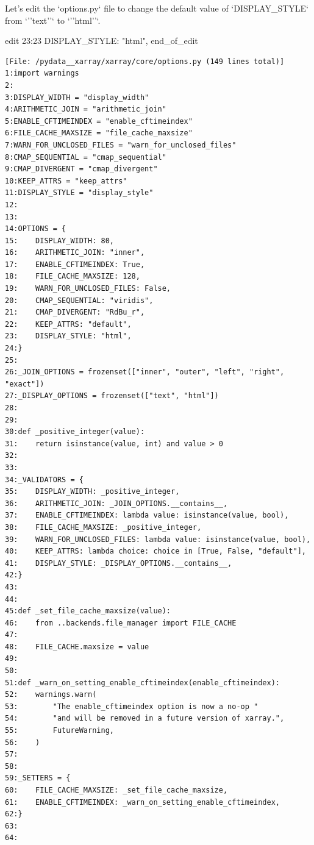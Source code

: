 {\begin{agentbox}
Let's edit the `options.py` file to change the default value of `DISPLAY\_STYLE` from `''text''` to `''html''`.



\hrulefill
\begin{CodeVerbatim}[breaklines=true, breakanywhere=true]
edit 23:23
    DISPLAY_STYLE: "html",
end_of_edit
\end{CodeVerbatim}
\end{agentbox}
\begin{observationbox}\begin{Verbatim}[breaklines=true, breakanywhere=true]
[File: /pydata__xarray/xarray/core/options.py (149 lines total)]
1:import warnings
2:
3:DISPLAY_WIDTH = "display_width"
4:ARITHMETIC_JOIN = "arithmetic_join"
5:ENABLE_CFTIMEINDEX = "enable_cftimeindex"
6:FILE_CACHE_MAXSIZE = "file_cache_maxsize"
7:WARN_FOR_UNCLOSED_FILES = "warn_for_unclosed_files"
8:CMAP_SEQUENTIAL = "cmap_sequential"
9:CMAP_DIVERGENT = "cmap_divergent"
10:KEEP_ATTRS = "keep_attrs"
11:DISPLAY_STYLE = "display_style"
12:
13:
14:OPTIONS = {
15:    DISPLAY_WIDTH: 80,
16:    ARITHMETIC_JOIN: "inner",
17:    ENABLE_CFTIMEINDEX: True,
18:    FILE_CACHE_MAXSIZE: 128,
19:    WARN_FOR_UNCLOSED_FILES: False,
20:    CMAP_SEQUENTIAL: "viridis",
21:    CMAP_DIVERGENT: "RdBu_r",
22:    KEEP_ATTRS: "default",
23:    DISPLAY_STYLE: "html",
24:}
25:
26:_JOIN_OPTIONS = frozenset(["inner", "outer", "left", "right", "exact"])
27:_DISPLAY_OPTIONS = frozenset(["text", "html"])
28:
29:
30:def _positive_integer(value):
31:    return isinstance(value, int) and value > 0
32:
33:
34:_VALIDATORS = {
35:    DISPLAY_WIDTH: _positive_integer,
36:    ARITHMETIC_JOIN: _JOIN_OPTIONS.__contains__,
37:    ENABLE_CFTIMEINDEX: lambda value: isinstance(value, bool),
38:    FILE_CACHE_MAXSIZE: _positive_integer,
39:    WARN_FOR_UNCLOSED_FILES: lambda value: isinstance(value, bool),
40:    KEEP_ATTRS: lambda choice: choice in [True, False, "default"],
41:    DISPLAY_STYLE: _DISPLAY_OPTIONS.__contains__,
42:}
43:
44:
45:def _set_file_cache_maxsize(value):
46:    from ..backends.file_manager import FILE_CACHE
47:
48:    FILE_CACHE.maxsize = value
49:
50:
51:def _warn_on_setting_enable_cftimeindex(enable_cftimeindex):
52:    warnings.warn(
53:        "The enable_cftimeindex option is now a no-op "
54:        "and will be removed in a future version of xarray.",
55:        FutureWarning,
56:    )
57:
58:
59:_SETTERS = {
60:    FILE_CACHE_MAXSIZE: _set_file_cache_maxsize,
61:    ENABLE_CFTIMEINDEX: _warn_on_setting_enable_cftimeindex,
62:}
63:
64:

\end{Verbatim}
\end{observationbox}}

